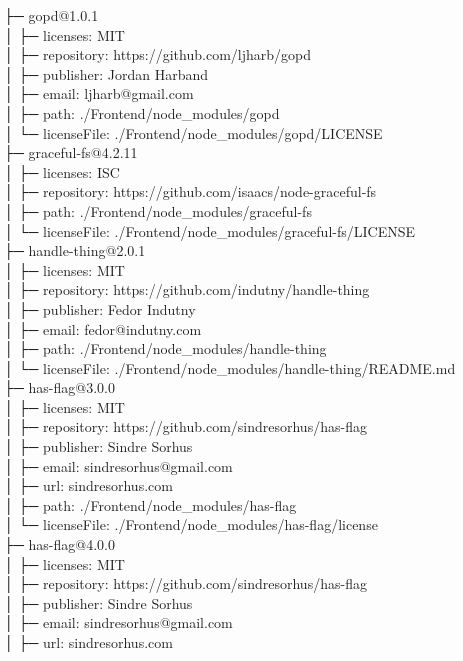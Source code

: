 ├─ gopd@1.0.1\\
│  ├─ licenses: MIT\\
│  ├─ repository: https://github.com/ljharb/gopd\\
│  ├─ publisher: Jordan Harband\\
│  ├─ email: ljharb@gmail.com\\
│  ├─ path: ./Frontend/node\_modules/gopd\\
│  └─ licenseFile: ./Frontend/node\_modules/gopd/LICENSE\\
├─ graceful-fs@4.2.11\\
│  ├─ licenses: ISC\\
│  ├─ repository: https://github.com/isaacs/node-graceful-fs\\
│  ├─ path: ./Frontend/node\_modules/graceful-fs\\
│  └─ licenseFile: ./Frontend/node\_modules/graceful-fs/LICENSE\\
├─ handle-thing@2.0.1\\
│  ├─ licenses: MIT\\
│  ├─ repository: https://github.com/indutny/handle-thing\\
│  ├─ publisher: Fedor Indutny\\
│  ├─ email: fedor@indutny.com\\
│  ├─ path: ./Frontend/node\_modules/handle-thing\\
│  └─ licenseFile: ./Frontend/node\_modules/handle-thing/README.md\\
├─ has-flag@3.0.0\\
│  ├─ licenses: MIT\\
│  ├─ repository: https://github.com/sindresorhus/has-flag\\
│  ├─ publisher: Sindre Sorhus\\
│  ├─ email: sindresorhus@gmail.com\\
│  ├─ url: sindresorhus.com\\
│  ├─ path: ./Frontend/node\_modules/has-flag\\
│  └─ licenseFile: ./Frontend/node\_modules/has-flag/license\\
├─ has-flag@4.0.0\\
│  ├─ licenses: MIT\\
│  ├─ repository: https://github.com/sindresorhus/has-flag\\
│  ├─ publisher: Sindre Sorhus\\
│  ├─ email: sindresorhus@gmail.com\\
│  ├─ url: sindresorhus.com\\
